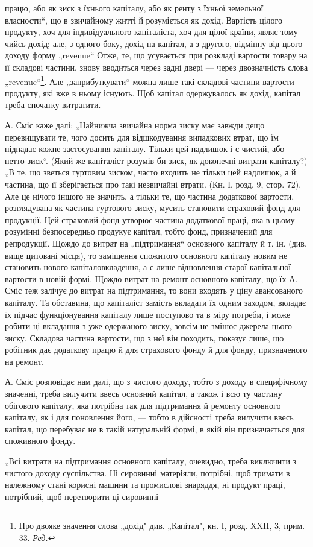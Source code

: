 \parcont{}  %
працю, або як зиск з їхнього капіталу, або як ренту з їхньої земельної
власности“, що в звичайному житті й розуміється як дохід. Вартість
цілого продукту, хоч для індивідуального капіталіста, хоч для цілої країни,
являє тому чийсь дохід; але, з одного боку, дохід на капітал, а з другого,
відмінну від цього доходу форму „revenue“ Отже, те, що усувається при
розкладі вартости товару на її складові частини, знову вводиться через
задні двері — через двозначність слова „revenue“\footnote*{
Про двояке значення слова „дохід" див. „Капітал", кн. І, розд. XXII, 3,
прим. 33. \emph{Ред.}
}. Але „заприбуткувати“
можна лише такі складові частини вартости продукту, які вже в ньому
існують. Щоб капітал одержувалось як дохід, капітал треба спочатку
витратити.

А. Сміс каже далі: „Найнижча звичайна норма зиску має завжди
дещо перевищувати те, чого досить для відшкодування випадкових втрат,
що їм підпадає кожне застосування капіталу. Тільки цей надлишок і є
чистий, або нетто-зиск“. (Який же капіталіст розумів би зиск, як
доконечні витрати капіталу?) „В те, що зветься гуртовим зиском, часто
входить не тільки цей надлишок, а й частина, що її зберігається про
такі незвичайні втрати. (Кн. І, розд. 9, стор. 72). Але це нічого іншого
не значить, а тільки те, що частина додаткової вартости, розглядувана
як частина гуртового зиску, мусить становити страховий фонд для продукції.
Цей страховий фонд утворює частина додаткової праці, яка в
цьому розумінні безпосередньо продукує капітал, тобто фонд, призначений
для репродукції. Щождо до витрат на „підтримання“ основного
капіталу й т. ін. (див. вище цитовані місця), то заміщення спожитого
основного капіталу новим не становить нового капіталовкладення, а є
лише відновлення старої капітальної вартости в новій формі. Щождо
витрат на ремонт основного капіталу, що їх А. Сміс теж залічує до витрат
на підтримання, то вони входять у ціну авансованого капіталу.
Та обставина, що капіталіст замість вкладати їх одним заходом, вкладає
їх підчас функціонування капіталу лише поступово та в міру потреби,
і може робити ці вкладання з уже одержаного зиску, зовсім не змінює
джерела цього зиску. Складова частина вартости, що з неї він походить,
показує лише, що робітник дає додаткову працю й для страхового фонду
й для фонду, призначеного на ремонт.

А. Сміс розповідає нам далі, що з чистого доходу, тобто з доходу в
специфічному значенні, треба вилучити ввесь основний капітал, а також і
всю ту частину обігового капіталу, яка потрібна так для підтримання й
ремонту основного капіталу, як і для поновлення його, — тобто в дійсності
треба вилучити ввесь капітал, що перебуває не в такій натуральній
формі, в якій він призначається для споживного фонду.

„Всі витрати на підтримання основного капіталу, очевидно, треба
виключити з чистого доходу суспільства. Ні сировинні матеріяли, потрібні,
щоб тримати в належному стані корисні машини та промислові
знаряддя, ні продукт праці, потрібний, щоб перетворити ці сировинні
\parbreak{}  %

